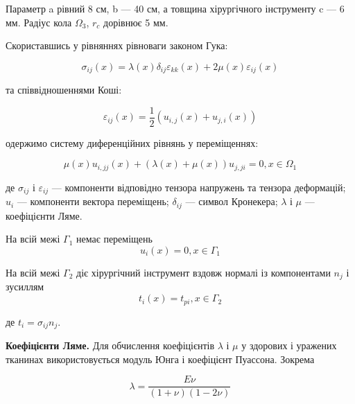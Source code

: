\noindent Параметр a рівний 8 см, b --- 40 см, а товщина хірургічного інструменту c --- 6 мм. Радіус кола $\Omega_3$, 
$r_c$ дорівнює 5 мм.

Скориставшись у рівняннях рівноваги законом Гука:

\begin{equation}
    \label{eqn:elasticity_hooke_law}
    \sigma_{ij}(x) = \lambda(x)\delta_{ij}\varepsilon_{kk}(x) + 2\mu(x)\varepsilon_{ij}(x)
\end{equation}

\noindent та співвідношеннями Коші:

\begin{equation}
    \label{eqn:elasticity_gauchy_tensor}
    \varepsilon_{ij}(x) = \frac{1}{2}(u_{i,j}(x) + u_{j,i}(x))
\end{equation}

\noindent одержимо систему диференційних рівнянь у переміщеннях:

\begin{equation}
    \label{eqn:elasticity_3d_eqn}
    \mu(x)u_{i,jj}(x) + (\lambda(x) + \mu(x))u_{j,ji} = 0, x \in \Omega_1
\end{equation}

\noindent де $\sigma_{ij}$ і $\varepsilon_{ij}$ --- компоненти відповідно тензора напружень та тензора деформацій; $u_i$
--- компоненти вектора переміщень; $\delta_{ij}$ --- символ Кронекера; $\lambda$ і $\mu$ --- коефіцієнти Ляме.

\noindent На всій межі $\Gamma_1$ немає переміщень
\begin{equation}
    \label{eqn:elasticity_3d_cond_1}
    u_i(x) = 0, x \in \Gamma_1
\end{equation}

\noindent На всій межі $\Gamma_2$ діє хірургічний інструмент вздовж нормалі із компонентами $n_j$ і зусиллям
\begin{equation}
    \label{eqn:elasticity_3d_cond_2}
    t_i(x) = t_{pi}, x \in \Gamma_2
\end{equation}

\noindent де $t_i = \sigma_{ij}n_j$.

\textbf{Коефіцієнти Ляме.} Для обчислення коефіцієнтів $\lambda$ і $\mu$ у здорових і уражених тканинах використовується
модуль Юнга і коефіцієнт Пуассона. Зокрема

\begin{equation}
    \label{eqn:elasticity_3d_lame_lambda_convertion}
    \lambda = \frac{E\nu}{(1+\nu)(1-2\nu)}
\end{equation}

